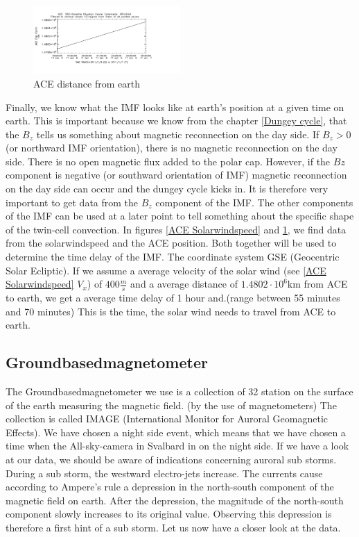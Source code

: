 \documentclass[10pt,a4paper]{article}
\begin{document}
\begin{figure}[h]
\centering
\includegraphics[width=0.5\textwidth]{ACE_distance.pdf}
\caption{ ACE distance from earth \label{ACE distance}}
\end{figure}
Finally, we know what the IMF looks like at earth's position at a given time on earth. 
This is important because we know from the chapter \ref{Dungey cycle}, that the $B_z$ tells us something about magnetic reconnection on the day side. If $B_z>0$ (or northward IMF orientation), there is no magnetic reconnection on the day side. There is no open magnetic flux added to the polar cap. 
However, if the $Bz$ component is negative (or southward orientation of IMF) magnetic reconnection on the day side can occur and the dungey cycle kicks in. 
It is therefore very important to get data from the $B_z$ component of the IMF. The other components of the IMF can be used at a later point to tell something about the specific shape of the twin-cell convection. In figures \ref{ACE Solarwindspeed} and \ref{ACE distance}, we find data from the solarwindspeed and the ACE position. Both together will be used to determine the time delay of the IMF. The coordinate system GSE (Geocentric Solar Ecliptic). If we assume a average velocity of the solar wind (see \ref{ACE Solarwindspeed} $V_x$) of $400 \frac{m}{s}$ and a average distance of $1.4802 \cdot 10^{6} \mathrm{km}$ from ACE to earth, we get a average time delay of 1 hour and.(range between 55 minutes and 70 minutes) This is the time, the solar wind needs to travel from ACE to earth. 


\clearpage
\subsection{Groundbasedmagnetometer\label{0_CHAPTER_GROUNDBASEDMag}}

The Groundbasedmagnetometer we use is a collection of 32 station on the surface of the earth measuring the magnetic field. (by the use of magnetometers) 
The collection is called IMAGE (International Monitor for Auroral Geomagnetic Effects). We have chosen a night side event, which means that we have chosen a time when the All-sky-camera in Svalbard in on the night side. 
If we have a look at our data, we should be aware of indications concerning auroral sub storms. During a sub storm, the westward electro-jets increase. The currents cause according to Ampere's rule a depression in the north-south component of the magnetic field on earth. After the depression, the magnitude of the north-south component slowly increases to its original value.
Observing this depression is therefore a first hint of a sub storm. 
Let us now have a closer look at the data. 
\end{document}
